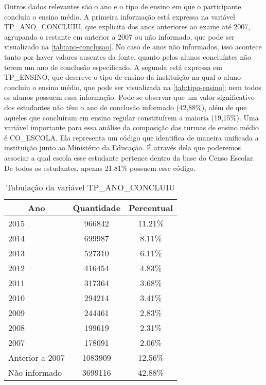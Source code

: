   Outros dados relevantes são o ano e o tipo de ensino em que o participante concluíu o ensino médio. A primeira informação está expressa na variável TP\_ANO\_CONCLUIU, que explicita dos anos anteriores ao exame até 2007, agrupando o restante em anterior a 2007 ou não informado, que pode ser visualizado na \autoref{tab:ano-conclusao}. No caso de anos não informados, isso acontece tanto por haver valores ausentes da fonte, quanto pelos alunos concluíntes não terem um ano de conclusão especificado. A segunda está expressa em TP\_ENSINO, que descreve o tipo de ensino da instituição na qual o aluno concluiu o ensino médio, que pode ser visualizada na \autoref{tab:tipo-ensino}; nem todos os alunos possuem essa informação. Pode-se observar que um valor significativo dos estudantes não têm o ano de conclusão informado (42,88\%), além de que aqueles que concluíram em ensino regular constituírem a maioria (19,15\%). Uma variável importante para essa análise da composição das turmas de ensino médio é CO\_ESCOLA. Ela representa um código que identifica de maneira unificada a instituição junto ao Ministério da Educação. É através dela que poderemos associar a qual escola esse estudante pertence dentro da base do Censo Escolar. De todos os estudantes, apenas 21.81\% possuem esse código.

  \begin{table}[h]
    \begin{tabular}{lcc}
    \hline
    \multicolumn{1}{c}{\textbf{Ano}} & \textbf{Quantidade} & \textbf{Percentual} \\ \hline
    2015                             & 966842              & 11.21\%             \\ \hline
    2014                             & 699987              & 8.11\%              \\ \hline
    2013                             & 527310              & 6.11\%              \\ \hline
    2012                             & 416454              & 4.83\%              \\ \hline
    2011                             & 317364              & 3.68\%              \\ \hline
    2010                             & 294214              & 3.41\%              \\ \hline
    2009                             & 244461              & 2.83\%              \\ \hline
    2008                             & 199619              & 2.31\%              \\ \hline
    2007                             & 178091              & 2.06\%              \\ \hline
    Anterior a 2007                  & 1083909             & 12.56\%             \\ \hline
    Não informado                    & 3699116             & 42.88\%             \\ \hline
    \end{tabular}
    \caption{Tabulação da variável TP\_ANO\_CONCLUIU}
    \label{tab:ano-conclusao}
    \end{table}

